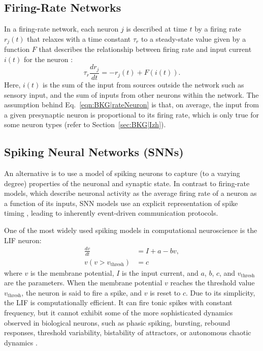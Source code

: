 \subsection{Firing-Rate Networks}
\label{sec:BKG|rateModel}
In a firing-rate network, each neuron $j$ is described 
at time $t$ by a firing rate $r_j(t)$ that relaxes with a time constant
$\tau_r$ to a steady-state value given by a function $F$ that describes
the relationship between firing rate and input current $i(t)$ for the neuron
\citep{Vogels2005}:
\begin{equation}
\tau_r \frac{dr_j}{dt} = -r_j(t) + F(i(t)).
\label{eqn:BKG|rateNeuron}
\end{equation}
Here, $i(t)$ is the sum of the input from sources outside the network
such as sensory input, and the sum of inputs from other neurons within
the network.
The assumption behind Eq.~\ref{eqn:BKG|rateNeuron} is that, on average,
the input from a given presynaptic neuron is proportional to its firing
rate, which is only true for some neuron types
(refer to Section~\ref{sec:BKG|Izh}).


\subsection{Spiking Neural Networks (SNNs)}
\label{sec:BKG|SNN}

An alternative is to use a model of spiking neurons to capture
(to a varying degree) properties of the neuronal and synaptic state.
In contrast to firing-rate models, which describe neuronal activity as the
average firing rate of a neuron as a function of its inputs, \acf{SNN} models
use an explicit representation of spike timing \citep{MaassBishop2001,Brette2007},
leading to inherently event-driven communication protocols.

One of the most widely used spiking models in computational neuroscience is
the \ac{LIF} neuron:
\begin{align}
	\frac{dv}{dt} & = I + a - bv, \label{eqn:BKG|LIF} \\
    v(v > v_{\textrm{thresh}}) & = c
\end{align}
where $v$ is the membrane potential, $I$ is the input current, and $a$, $b$,
$c$, and $v_{\textrm{thresh}}$ are the parameters.
When the membrane potential $v$ reaches the threshold value $v_{\textrm{thresh}}$,
the neuron is said to fire a spike, and $v$ is reset to $c$.
Due to its simplicity, the \ac{LIF} is computationally efficient. 
It can fire tonic spikes with constant frequency, but it cannot
exhibit some of the more sophisticated dynamics observed in biological neurons,
such as phasic spiking, bursting, rebound responses, threshold variability,
bistability of attractors, or autonomous chaotic dynamics \citep{Izhikevich2004a}.

